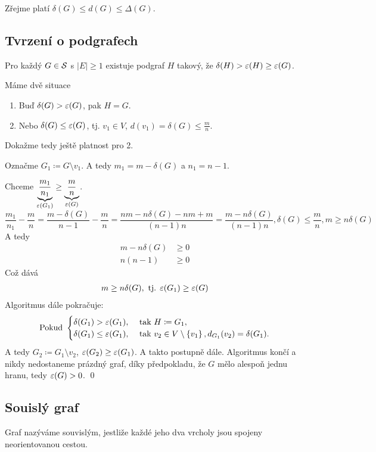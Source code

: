Zřejme platí $\delta(G) \leq d(G) \leq \Delta(G)$.

\subsection{Tvrzení o podgrafech}
 Pro každý $G \in \S$ s $|E| \geq 1$ existuje podgraf $H$ takový, že $\delta(H) > \eps(H) \geq \eps(G)$.

 Máme dvě situace
\begin{enumerate}
    \item Buď $\delta(G) > \eps(G)$, pak $H=G$.
    \item Nebo $\delta(G) \leq \eps(G)$, tj. $v_1 \in V$, $d(v_1) = \delta(G) \leq \frac{m}{n}$.
\end{enumerate}
Dokažme tedy ještě platnost pro 2.

Označme $G_1 \coloneq G \setminus v_1$. A tedy $m_1 = m - \delta(G)$ a $n_1 = n - 1$.

Chceme $\underbrace{\frac{m_1}{n_1}}_{\eps(G_1)} \geq \underbrace{\frac{m}{n}}_{\eps(G)}$.
\begin{equation}
    \frac{m_1}{n_1} - \frac{m}{n} = \frac{m-\delta(G)}{n-1} - \frac{m}{n} = \frac{nm - n\delta(G) - nm + m}{(n-1)n}
    = \frac{m-n\delta(G)}{(n-1)n}, \delta(G) \leq \frac{m}{n}, m \geq n \delta(G)
\end{equation}
A tedy
\begin{align*}
    m-n\delta(G) &\geq 0 \\
    n(n-1) &\geq 0
\end{align*}
Což dává
\begin{align*}
    m \geq n \delta(G), \text{ tj. } \eps(G_1) \geq \eps(G)
\end{align*}
Algoritmus dále pokračuje:
\[
\text{Pokud }
\begin{cases}
    \delta(G_1) > \eps(G_1), &\text{ tak } H \coloneq G_1, \\
    \delta(G_1) \leq \eps(G_1), &\text{ tak } v_2 \in V \setminus \bc{v_1}, d_{G_1}(v_2) = \delta(G_1).
\end{cases}
\]
A tedy $G_2 \coloneq G_1 \setminus v_2$, $\eps(G_2) \geq \eps(G_1)$. A takto postupně dále. Algoritmus končí a nikdy 
nedostaneme prázdný graf, díky předpokladu, že $G$ mělo alespoň jednu hranu, tedy $\eps(G)>0$.
\hspace{\fill}\qed

\subsection{Souislý graf}\label{souvisly}
Graf nazýváme souvislým, jestliže každé jeho dva vrcholy jsou spojeny neorientovanou cestou. 

